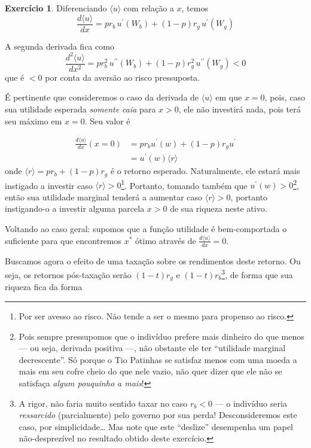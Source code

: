 \documentclass[12pt]{article}
\numberwithin{equation}{section}
\theoremstyle{plain}
\theoremstyle{definition}
\newtheorem{exercise}{Exercício}[section]
\theoremstyle{remark}
\begin{document}
\begin{exercise}
Diferenciando \(\langle u \rangle\) com relação a \(x\), temos
\[
\frac{d\langle u \rangle}{dx} = p r_{b} \, u^\prime(W_{b}) +(1-p) r_{g} \, u^\prime(W_{g})
\]

A segunda derivada fica como
\[
\frac{d^{2}\langle u \rangle}{dx^{2}} = p r_{b}^{2} \, u^{\prime\prime}(W_{b}) +(1-p) r_{g}^{2} \, u^{\prime\prime}(W_{g}) < 0
\]
que é \(<0\) por conta da aversão ao risco pressuposta.

É pertinente que consideremos o caso da derivada de
\(\langle u \rangle\) em que \(x=0\), pois, caso sua utilidade esperada
\textit{somente caia} para \(x>0\), ele não investirá nada, pois terá
seu máximo em \(x=0\). Seu valor é

\begin{align*}
\frac{d\langle u \rangle}{dx}(x=0) &= p r_{b} u^\prime(w) + (1-p) r_{g} u^\prime \\
&= u^\prime(w) \langle r \rangle 
\end{align*} onde \(\langle r \rangle=p r_{b} + (1-p) r_{g}\) é o
retorno esperado. Naturalmente, ele estará mais instigado a investir
caso \(\langle r \rangle>0\)\footnote{Por ser avesso ao risco. Não tende
  a ser o mesmo para propenso ao risco.}. Portanto, tomando também que
\(u^\prime(w)>0\)\footnote{Pois sempre pressupomos que o indivíduo
  prefere mais dinheiro do que menos --- ou seja, derivada positiva ---,
  não obstante ele ter ``utilidade marginal decrescente''. Só porque o
  Tio Patinhas se satisfaz menos com uma moeda a mais em seu cofre cheio
  do que nele vazio, não quer dizer que ele não se satisfaça
  \textit{algum pouquinho a mais}!}, então sua utilidade marginal
tenderá a aumentar caso \(\langle r \rangle>0\), portanto instigando-o a
investir alguma parcela \(x>0\) de sua riqueza neste ativo.

Voltando ao caso geral: supomos que a função utilidade é bem-comportada
o suficiente para que encontremos \(x^*\) ótimo através de
\(\frac{d\langle u \rangle}{dx}=0\).

Buscamos agora o efeito de uma taxação sobre os rendimentos deste
retorno. Ou seja, os retornos pós-taxação serão \((1-t)r_{g}\) e
\((1-t)r_{b}\)\footnote{A rigor, não faria muito sentido taxar no caso
  \(r_{b}<0\) --- o indivíduo seria \textit{ressarcido} (parcialmente)
  pelo governo por sua perda! Desconsideremos este caso, por
  simplicidade\ldots{} Mas note que este ``deslize'' desempenha um papel
  não-desprezível no resultado obtido deste exercício.}, de forma que
sua riqueza fica da forma


\end{exercise}
\end{document}
